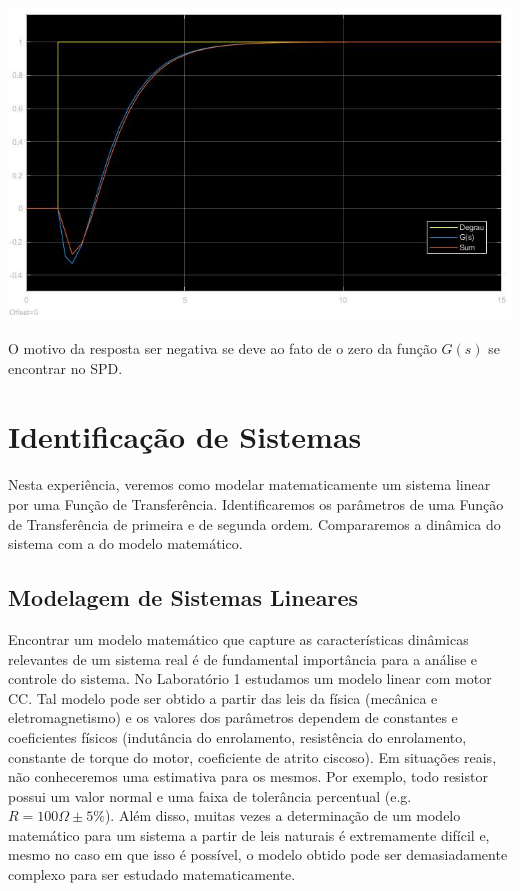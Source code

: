 \documentclass[
]{book}
\theoremstyle{definition}
\theoremstyle{definition}
\theoremstyle{definition}
\theoremstyle{remark}
\begin{document}
\includegraphics{Imagens/Lab2/prob6C.jpg}

O motivo da resposta ser negativa se deve ao fato de o zero da função \(G(s)\) se encontrar no SPD.

\hypertarget{lab3}{%
\chapter{Identificação de Sistemas}\label{lab3}}

Nesta experiência, veremos como modelar matematicamente um sistema linear por uma Função de Transferência. Identificaremos os parâmetros de uma Função de Transferência de primeira e de segunda ordem. Compararemos a dinâmica do sistema com a do modelo matemático.

\hypertarget{modelagem-de-sistemas-lineares}{%
\section{Modelagem de Sistemas Lineares}\label{modelagem-de-sistemas-lineares}}

Encontrar um modelo matemático que capture as características dinâmicas relevantes de um sistema real é de fundamental importância para a análise e controle do sistema. No Laboratório 1 estudamos um modelo linear com motor CC. Tal modelo pode ser obtido a partir das leis da física (mecânica e eletromagnetismo) e os valores dos parâmetros dependem de constantes e coeficientes físicos (indutância do enrolamento, resistência do enrolamento, constante de torque do motor, coeficiente de atrito ciscoso). Em situações reais, não conheceremos uma estimativa para os mesmos. Por exemplo, todo resistor possui um valor normal e uma faixa de tolerância percentual (e.g.~\(R = 100 \Omega \pm 5\%\)). Além disso, muitas vezes a determinação de um modelo matemático para um sistema a partir de leis naturais é extremamente difícil e, mesmo no caso em que isso é possível, o modelo obtido pode ser demasiadamente complexo para ser estudado matematicamente.
\end{document}

